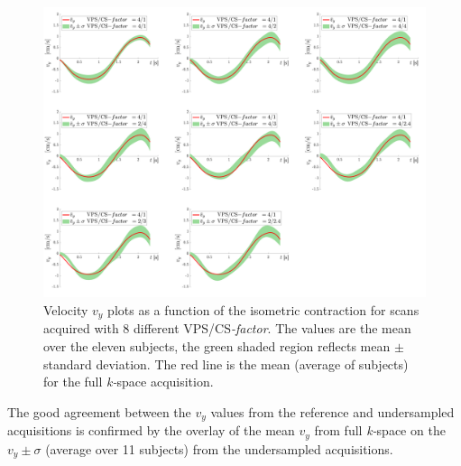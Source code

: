 \begin{figure}[!htb]
\vspace{+0.2cm}
\centering
\includegraphics[width=\textwidth]{Figures/CS1_13.pdf}
\caption[Velocity $v_y$ plots as a function of the isometric contraction for scans acquired with 8 different VPS/\mbox{CS\textit{-factor}}]{Velocity $v_y$ plots as a function of the isometric contraction for scans acquired with 8 different VPS/\mbox{CS\textit{-factor}}. The values are the mean over the eleven subjects, the green shaded region reflects mean $\pm$ standard deviation. The red line is the mean (average of subjects) for the full \mbox{\textit{k-}space} acquisition.}
\label{fig: CS8}
\end{figure}
The good agreement between the $v_y$ values from the reference and undersampled acquisitions is confirmed by the overlay of the mean $v_y$ from full \mbox{\textit{k-}space} on the $v_y \pm \sigma$ (average over 11 subjects) from the undersampled acquisitions. 

